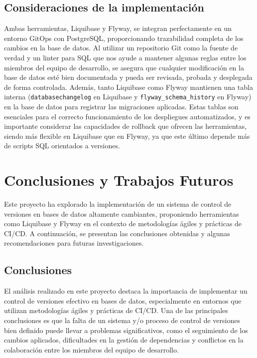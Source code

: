 \documentclass{IEEEtran}
\begin{document}
\subsection{Consideraciones de la implementación}
Ambas herramientas, Liquibase y Flyway, se integran perfectamente en un entorno GitOps con PostgreSQL, proporcionando trazabilidad completa de los cambios en la base de datos. Al utilizar un repositorio Git como la fuente de verdad y un linter para SQL que nos ayude a mantener algunas reglas entre los miembros del equipo de desarrollo, se asegura que cualquier modificación en la base de datos esté bien documentada y pueda ser revisada, probada y desplegada de forma controlada. Además, tanto Liquibase como Flyway mantienen una tabla interna (\texttt{databasechangelog} en Liquibase y \texttt{flyway\_schema\_history} en Flyway) en la base de datos para registrar las migraciones aplicadas. Estas tablas son esenciales para el correcto funcionamiento de los despliegues automatizados, y es importante considerar las capacidades de rollback que ofrecen las herramientas, siendo más flexible en Liquibase que en Flyway, ya que este último depende más de scripts SQL orientados a versiones.


\section{Conclusiones y Trabajos Futuros}
Este proyecto ha explorado la implementación de un sistema de control de versiones en bases de datos altamente cambiantes, proponiendo herramientas como Liquibase y Flyway en el contexto de metodologías ágiles y prácticas de CI/CD. A continuación, se presentan las conclusiones obtenidas y algunas recomendaciones para futuras investigaciones.

\subsection{Conclusiones}
El análisis realizado en este proyecto destaca la importancia de implementar un control de versiones efectivo en bases de datos, especialmente en entornos que utilizan metodologías ágiles y prácticas de CI/CD. Una de las principales conclusiones es que la falta de un sistema y/o proceso de control de versiones bien definido puede llevar a problemas significativos, como el seguimiento de los cambios aplicados, dificultades en la gestión de dependencias y conflictos en la colaboración entre los miembros del equipo de desarrollo. 
\end{document}

